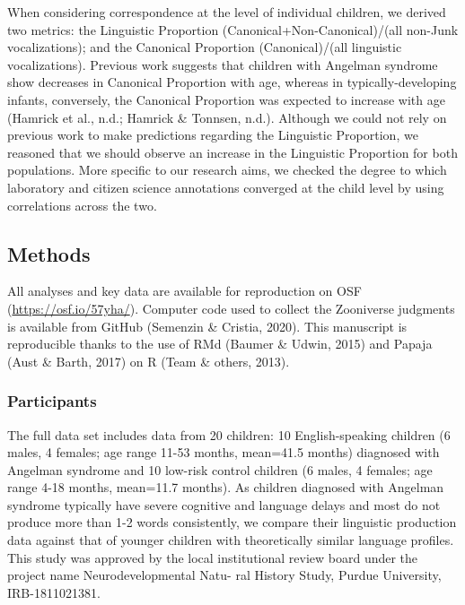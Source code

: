 \documentclass[english,,man,floatsintext]{apa6}
\begin{document}
When considering correspondence at the level of individual children, we derived two metrics: the Linguistic Proportion (Canonical+Non-Canonical)/(all non-Junk vocalizations); and the Canonical Proportion (Canonical)/(all linguistic vocalizations). Previous work suggests that children with Angelman syndrome show decreases in Canonical Proportion with age, whereas in typically-developing infants, conversely, the Canonical Proportion was expected to increase with age (Hamrick et al., n.d.; Hamrick \& Tonnsen, n.d.). Although we could not rely on previous work to make predictions regarding the Linguistic Proportion, we reasoned that we should observe an increase in the Linguistic Proportion for both populations. More specific to our research aims, we checked the degree to which laboratory and citizen science annotations converged at the child level by using correlations across the two.

\hypertarget{methods}{%
\subsection{Methods}\label{methods}}

All analyses and key data are available for reproduction on OSF (\url{https://osf.io/57yha/}). Computer code used to collect the Zooniverse judgments is available from GitHub (Semenzin \& Cristia, 2020). This manuscript is reproducible thanks to the use of RMd (Baumer \& Udwin, 2015) and Papaja (Aust \& Barth, 2017) on R (Team \& others, 2013).

\hypertarget{participants}{%
\subsubsection{Participants}\label{participants}}

The full data set includes data from 20 children: 10 English-speaking children (6 males, 4 females; age range 11-53 months, mean=41.5 months) diagnosed with Angelman syndrome and 10 low-risk control children (6 males, 4 females; age range 4-18 months, mean=11.7 months). As children diagnosed with Angelman syndrome typically have severe cognitive and language delays and most do not produce more than 1-2 words consistently, we compare their linguistic production data against that of younger children with theoretically similar language profiles. This study was approved by the local institutional review board under the project name Neurodevelopmental Natu- ral History Study, Purdue University, IRB-1811021381.
\end{document}

